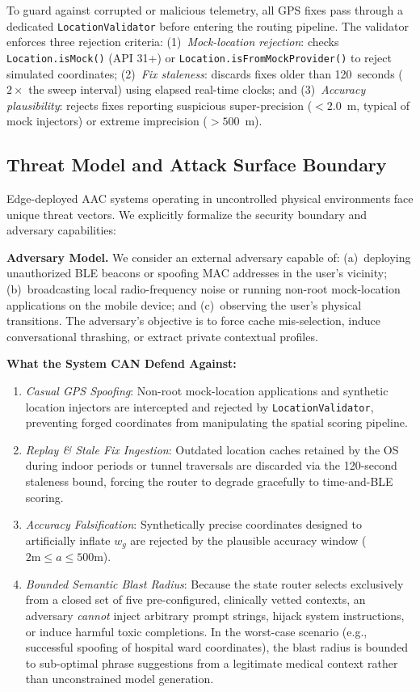 \documentclass[journal]{IEEEtran}
\begin{document}
To guard against corrupted or malicious telemetry, all GPS fixes pass through a dedicated \texttt{LocationValidator} before entering the routing pipeline. The validator enforces three rejection criteria: (1)~\emph{Mock-location rejection}: checks \texttt{Location.isMock()} (API 31+) or \texttt{Location.isFromMockProvider()} to reject simulated coordinates; (2)~\emph{Fix staleness}: discards fixes older than 120~seconds ($2 \times$ the sweep interval) using elapsed real-time clocks; and (3)~\emph{Accuracy plausibility}: rejects fixes reporting suspicious super-precision ($< 2.0$~m, typical of mock injectors) or extreme imprecision ($> 500$~m).

\subsection{Threat Model and Attack Surface Boundary}
\label{sec:threat_model}

Edge-deployed AAC systems operating in uncontrolled physical environments face unique threat vectors. We explicitly formalize the security boundary and adversary capabilities:

\textbf{Adversary Model.} We consider an external adversary capable of: (a)~deploying unauthorized BLE beacons or spoofing MAC addresses in the user's vicinity; (b)~broadcasting local radio-frequency noise or running non-root mock-location applications on the mobile device; and (c)~observing the user's physical transitions. The adversary's objective is to force cache mis-selection, induce conversational thrashing, or extract private contextual profiles.

\textbf{What the System CAN Defend Against:}
\begin{enumerate}
    \item \emph{Casual GPS Spoofing}: Non-root mock-location applications and synthetic location injectors are intercepted and rejected by \texttt{LocationValidator}, preventing forged coordinates from manipulating the spatial scoring pipeline.
    \item \emph{Replay \& Stale Fix Ingestion}: Outdated location caches retained by the OS during indoor periods or tunnel traversals are discarded via the 120-second staleness bound, forcing the router to degrade gracefully to time-and-BLE scoring.
    \item \emph{Accuracy Falsification}: Synthetically precise coordinates designed to artificially inflate $w_g$ are rejected by the plausible accuracy window ($2\text{m} \le a \le 500\text{m}$).
    \item \emph{Bounded Semantic Blast Radius}: Because the state router selects exclusively from a closed set of five pre-configured, clinically vetted contexts, an adversary \emph{cannot} inject arbitrary prompt strings, hijack system instructions, or induce harmful toxic completions. In the worst-case scenario (e.g., successful spoofing of hospital ward coordinates), the blast radius is bounded to sub-optimal phrase suggestions from a legitimate medical context rather than unconstrained model generation.
\end{enumerate}
\end{document}
